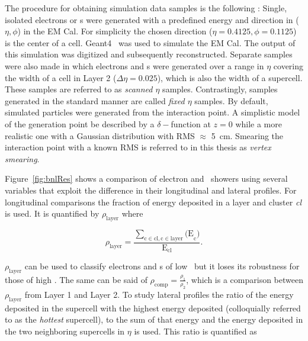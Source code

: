 \par The procedure for obtaining simulation data samples is the
following : Single, isolated electrons or \pizero s were generated
with a predefined energy and direction in ($\eta, \phi$) in the EM
Cal. For simplicity the chosen direction ($\eta=0.4125, \phi=0.1125$)
 is the center of a cell. Geant4~\cite{Agostinelli2003250} was used to
simulate the EM Cal. The output of this simulation was digitized and
subsequently reconstructed. Separate samples were also made in which electrons and
\pizero s were generated over a range in $\eta$ covering the width
of a cell in Layer 2 ($\Delta\eta = 0.025$), which is also the width of
a supercell. These samples are referred to as {\it
scanned $\eta$} samples. Contrastingly, samples generated in the standard manner  
 are called {\it fixed $\eta$} samples. By default, simulated particles were 
generated from the interaction point. A simplistic model of the generation point 
be described by a $\delta-$function at $z=0$ while a more realistic one with a Gaussian distribution with RMS
$\approx$ \SI{5}{\cm}. Smearing the interaction point with a known RMS is 
referred to in this thesis as {\it vertex smearing}.

\par Figure~\ref{fig:bnlRes} shows a comparison of electron and \pizero\ 
showers using several variables that exploit the difference in their 
longitudinal and lateral profiles. For longitudinal comparisons the fraction 
of energy deposited in a layer and cluster {\it cl} is used. It is  
quantified by $\rho_{\textrm{layer}}$ where 

\begin{equation}
\rho_{\textrm{layer}} = \frac{\sum_{\textrm{c}\in\textrm{cl},\textrm{c}\in\textrm{layer}}\textrm{(E}_{\textrm{c}}\textrm{)}}{\textrm{E}_{\textrm{cl}}}.
\end{equation}

$\rho_{\textrm{layer}}$ can be used to classify electrons and \pizero s of low \pT\ but it 
loses its robustness for those of high \pT. The same can be said of $\rho_{\textrm{comp}}=\frac{\rho_{1}}{\rho_{2}}$, 
which is a comparison between  $\rho_{\textrm{layer}}$ from Layer 1 and Layer 2. To study lateral profiles 
the ratio of the energy deposited in the supercell with the highest energy deposited (colloquially 
referred to as the {\it hottest} supercell), to the sum of that energy and the 
energy deposited in the two neighboring supercells in $\eta$ is used. This ratio is quantified as 

